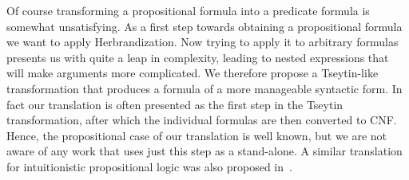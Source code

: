 \documentclass[a4paper,UKenglish,cleveref, autoref, thm-restate]{lipics-v2021}
\begin{document}
Of course transforming a propositional formula into a predicate formula is somewhat unsatisfying. As a first step towards obtaining a propositional formula we want to apply Herbrandization. Now trying to apply it to arbitrary formulas presents us with quite a leap in complexity, leading to nested expressions that will make arguments more complicated. We therefore propose a Tseytin-like transformation that produces a formula of a more manageable syntactic form. In fact our translation is often presented as the first step in the Tseytin transformation, after which the individual formulas are then converted to CNF.
Hence, the propositional case of our translation is well known, but we are not aware of any work that uses just this step as a stand-alone. A similar translation for intuitionistic propositional logic was also proposed in~\cite{statman1979intuitionistic}.
\end{document}
